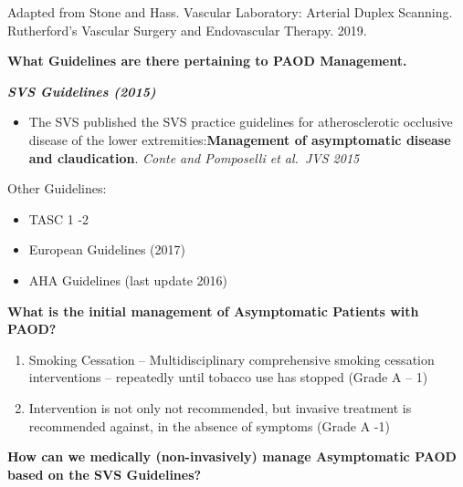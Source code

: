 \documentclass[
]{book}
\providecommand{\tightlist}{%
  \setlength{\itemsep}{0pt}\setlength{\parskip}{0pt}}
\begin{document}
Adapted from Stone and Hass. Vascular Laboratory: Arterial Duplex
Scanning. Rutherford's Vascular Surgery and Endovascular Therapy.
2019.\citep{stone21VascularLaboratory2019}

\textbf{What Guidelines are there pertaining to PAOD Management.}

\textbf{\emph{SVS Guidelines (2015)}}

\begin{itemize}
\tightlist
\item
  The SVS published the SVS practice guidelines for atherosclerotic
  occlusive disease of the lower extremities:\textbf{Management of
  asymptomatic disease and claudication}. \emph{Conte and Pomposelli et
  al.~JVS 2015} \citep{conteSocietyVascularSurgery2015}
\end{itemize}

Other Guidelines:

\begin{itemize}
\item
  TASC 1 -2
\item
  European Guidelines (2017)
\item
  AHA Guidelines (last update 2016)
\end{itemize}

\textbf{What is the initial management of Asymptomatic Patients with PAOD?}

\begin{enumerate}
\def\labelenumi{\arabic{enumi}.}
\tightlist
\item
  Smoking Cessation -- Multidisciplinary comprehensive smoking
  cessation interventions -- repeatedly until tobacco use has stopped
  (Grade A -- 1)
\item
  Intervention is not only not recommended, but invasive treatment is
  recommended against, in the absence of symptoms (Grade A -1)
\end{enumerate}

\textbf{How can we medically (non-invasively) manage Asymptomatic PAOD based
on the SVS Guidelines?}
\end{document}
